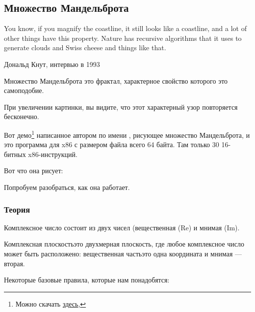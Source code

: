 ﻿\clearpage
\subsection{Множество Мандельброта}
\label{Mandelbrot_demo}

\epigraph{You know, if you magnify the coastline, it still looks like
a coastline, and a lot of other things have this property. Nature has
recursive algorithms that it uses to generate clouds and Swiss cheese
and things like that.}
{Дональд Кнут, интервью в 1993}

Множество Мандельброта это фрактал, характерное свойство которого это самоподобие.

При увеличении картинки, вы видите, что этот характерный узор повторяется бесконечно.


Вот демо\footnote{Можно скачать \href{http://go.yurichev.com/17306}
{здесь},} 
написанное автором по имени  , 
рисующее множество Мандельброта, и это программа для x86 с размером файла всего 64 байта.
Там только 30 16-битных x86-инструкций.

Вот что она рисует:

\begin{figure}[H]
\centering
{}
\end{figure}

Попробуем разобраться, как она работает.

\subsubsection{Теория}


Комплексное число состоит из двух чисел (вещественная (Re) и мнимая (Im).

Комплексная плоскость\EMDASH{}это двухмерная плоскость, где любое комплексное число может быть расположено:
вещественная часть\EMDASH{}это одна координата и мнимая --- вторая.

Некоторые базовые правила, которые нам понадобятся:

